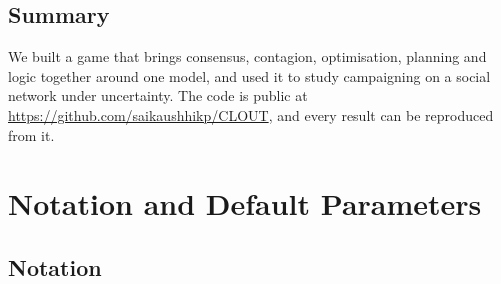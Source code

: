 \documentclass[11pt,a4paper,oneside]{report}
\newcommand{\repo}{\url{https://github.com/saikaushhikp/CLOUT}}
\newcommand{\summarysection}{\section{Summary}}
\begin{document}
\summarysection

We built a game that brings consensus, contagion, optimisation, planning and logic together around one
model, and used it to study campaigning on a social network under uncertainty. The code is public at
\repo, and every result can be reproduced from it.

\clearpage
{}



\appendix

\chapter{Notation and Default Parameters}\label{app:notation}

\section*{Notation}
\end{document}
